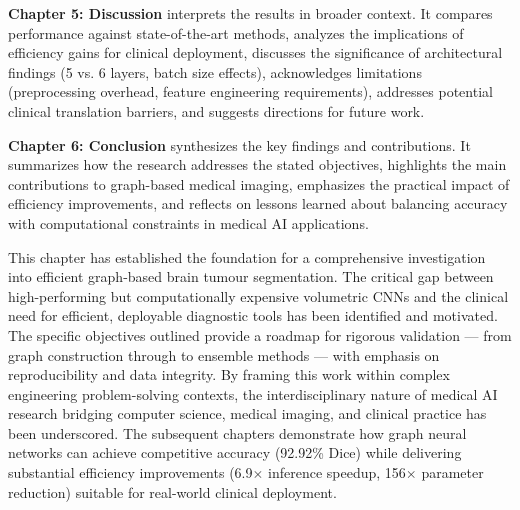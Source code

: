 \textbf{Chapter 5: Discussion} interprets the results in broader context. It compares performance against state-of-the-art methods, analyzes the implications of efficiency gains for clinical deployment, discusses the significance of architectural findings (5 vs. 6 layers, batch size effects), acknowledges limitations (preprocessing overhead, feature engineering requirements), addresses potential clinical translation barriers, and suggests directions for future work.

\textbf{Chapter 6: Conclusion} synthesizes the key findings and contributions. It summarizes how the research addresses the stated objectives, highlights the main contributions to graph-based medical imaging, emphasizes the practical impact of efficiency improvements, and reflects on lessons learned about balancing accuracy with computational constraints in medical AI applications.


\vspace{5mm}

This chapter has established the foundation for a comprehensive investigation into efficient graph-based brain tumour segmentation. The critical gap between high-performing but computationally expensive volumetric CNNs and the clinical need for efficient, deployable diagnostic tools has been identified and motivated. The specific objectives outlined provide a roadmap for rigorous validation — from graph construction through to ensemble methods — with emphasis on reproducibility and data integrity. By framing this work within complex engineering problem-solving contexts, the interdisciplinary nature of medical AI research bridging computer science, medical imaging, and clinical practice has been underscored. The subsequent chapters demonstrate how graph neural networks can achieve competitive accuracy (92.92\% Dice) while delivering substantial efficiency improvements (6.9$\times$ inference speedup, 156$\times$ parameter reduction) suitable for real-world clinical deployment.